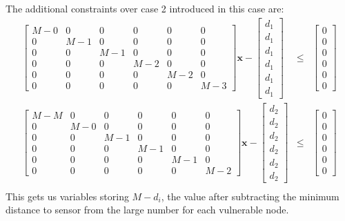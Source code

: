 \documentclass[authoryear,preprint,review,12pt]{elsarticle}
\begin{document}
The additional constraints over case 2 introduced in this case are:
\begin{eqnarray*}
\left[\begin{array}{cccccc}
M-0 & 0 & 0 & 0 & 0 & 0\\
0 & M-1 & 0 & 0 & 0 & 0\\
0 & 0 & M-1 & 0 & 0 & 0\\
0 & 0 & 0 & M-2 & 0 & 0\\
0 & 0 & 0 & 0 & M-2 & 0\\
0 & 0 & 0 & 0 & 0 & M-3
\end{array}\right]\mathbf{x}-\left[\begin{array}{c}
d_{1}\\
d_{1}\\
d_{1}\\
d_{1}\\
d_{1}\\
d_{1}
\end{array}\right] & \leq & \left[\begin{array}{c}
0\\
0\\
0\\
0\\
0\\
0
\end{array}\right]\\
\left[\begin{array}{cccccc}
M-M & 0 & 0 & 0 & 0 & 0\\
0 & M-0 & 0 & 0 & 0 & 0\\
0 & 0 & M-1 & 0 & 0 & 0\\
0 & 0 & 0 & M-1 & 0 & 0\\
0 & 0 & 0 & 0 & M-1 & 0\\
0 & 0 & 0 & 0 & 0 & M-2
\end{array}\right]\mathbf{x}-\left[\begin{array}{c}
d_{2}\\
d_{2}\\
d_{2}\\
d_{2}\\
d_{2}\\
d_{2}
\end{array}\right] & \leq & \left[\begin{array}{c}
0\\
0\\
0\\
0\\
0\\
0
\end{array}\right]\\
\end{eqnarray*}
This gets us variables storing $M-d_{i}$, the value after subtracting
the minimum distance to sensor from the large number for each vulnerable
node.
\end{document}
